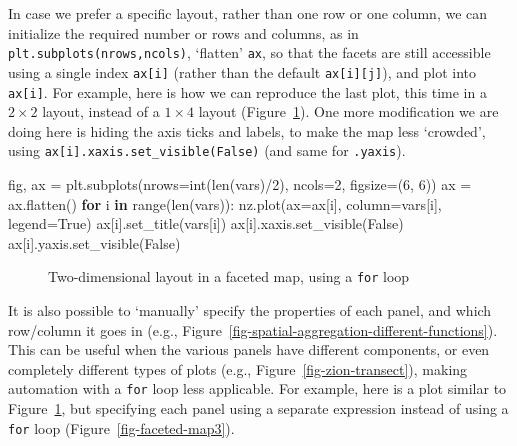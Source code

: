\documentclass[
  letterpaper,
]{krantz}
\newenvironment{Shaded}{\begin{snugshade}}{\end{snugshade}}
\newcommand{\BuiltInTok}[1]{\textcolor[rgb]{0.00,0.23,0.31}{#1}}
\newcommand{\ControlFlowTok}[1]{\textcolor[rgb]{0.00,0.23,0.31}{\textbf{#1}}}
\newcommand{\DecValTok}[1]{\textcolor[rgb]{0.68,0.00,0.00}{#1}}
\newcommand{\KeywordTok}[1]{\textcolor[rgb]{0.00,0.23,0.31}{\textbf{#1}}}
\newcommand{\NormalTok}[1]{\textcolor[rgb]{0.00,0.23,0.31}{#1}}
\newcommand{\OperatorTok}[1]{\textcolor[rgb]{0.37,0.37,0.37}{#1}}
\newcommand{\VariableTok}[1]{\textcolor[rgb]{0.07,0.07,0.07}{#1}}
\begin{document}
In case we prefer a specific layout, rather than one row or one column,
we can initialize the required number or rows and columns, as in
\texttt{plt.subplots(nrows,ncols)}, `flatten' \texttt{ax}, so that the
facets are still accessible using a single index \texttt{ax{[}i{]}}
(rather than the default \texttt{ax{[}i{]}{[}j{]}}), and plot into
\texttt{ax{[}i{]}}. For example, here is how we can reproduce the last
plot, this time in a \(2 \times 2\) layout, instead of a \(1 \times 4\)
layout (Figure~\ref{fig-faceted-map2}). One more modification we are
doing here is hiding the axis ticks and labels, to make the map less
`crowded', using \texttt{ax{[}i{]}.xaxis.set\_visible(False)} (and same
for \texttt{.yaxis}).

\begin{Shaded}
\begin{Highlighting}[]
\NormalTok{fig, ax }\OperatorTok{=}\NormalTok{ plt.subplots(nrows}\OperatorTok{=}\BuiltInTok{int}\NormalTok{(}\BuiltInTok{len}\NormalTok{(}\BuiltInTok{vars}\NormalTok{)}\OperatorTok{/}\DecValTok{2}\NormalTok{), ncols}\OperatorTok{=}\DecValTok{2}\NormalTok{, figsize}\OperatorTok{=}\NormalTok{(}\DecValTok{6}\NormalTok{, }\DecValTok{6}\NormalTok{))}
\NormalTok{ax }\OperatorTok{=}\NormalTok{ ax.flatten()}
\ControlFlowTok{for}\NormalTok{ i }\KeywordTok{in} \BuiltInTok{range}\NormalTok{(}\BuiltInTok{len}\NormalTok{(}\BuiltInTok{vars}\NormalTok{)):}
\NormalTok{    nz.plot(ax}\OperatorTok{=}\NormalTok{ax[i], column}\OperatorTok{=}\BuiltInTok{vars}\NormalTok{[i], legend}\OperatorTok{=}\VariableTok{True}\NormalTok{)}
\NormalTok{    ax[i].set\_title(}\BuiltInTok{vars}\NormalTok{[i])}
\NormalTok{    ax[i].xaxis.set\_visible(}\VariableTok{False}\NormalTok{)}
\NormalTok{    ax[i].yaxis.set\_visible(}\VariableTok{False}\NormalTok{)}
\end{Highlighting}
\end{Shaded}

\begin{figure}[H]


\caption{\label{fig-faceted-map2}Two-dimensional layout in a faceted
map, using a \texttt{for} loop}

\end{figure}%

It is also possible to `manually' specify the properties of each panel,
and which row/column it goes in (e.g.,
Figure~\ref{fig-spatial-aggregation-different-functions}). This can be
useful when the various panels have different components, or even
completely different types of plots (e.g.,
Figure~\ref{fig-zion-transect}), making automation with a \texttt{for}
loop less applicable. For example, here is a plot similar to
Figure~\ref{fig-faceted-map2}, but specifying each panel using a
separate expression instead of using a \texttt{for} loop
(Figure~\ref{fig-faceted-map3}).
\end{document}
